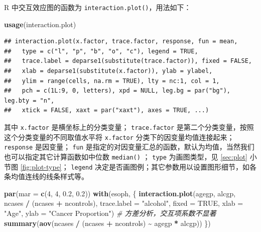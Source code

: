 \documentclass[
  b5paper,
  UTF8,twoside]{book}
\newenvironment{Shaded}{\begin{snugshade}}{\end{snugshade}}
\newcommand{\AttributeTok}[1]{\textcolor[rgb]{0.13,0.29,0.53}{#1}}
\newcommand{\CommentTok}[1]{\textcolor[rgb]{0.56,0.35,0.01}{\textit{#1}}}
\newcommand{\ConstantTok}[1]{\textcolor[rgb]{0.56,0.35,0.01}{#1}}
\newcommand{\DecValTok}[1]{\textcolor[rgb]{0.00,0.00,0.81}{#1}}
\newcommand{\FloatTok}[1]{\textcolor[rgb]{0.00,0.00,0.81}{#1}}
\newcommand{\FunctionTok}[1]{\textcolor[rgb]{0.13,0.29,0.53}{\textbf{#1}}}
\newcommand{\NormalTok}[1]{#1}
\newcommand{\SpecialCharTok}[1]{\textcolor[rgb]{0.81,0.36,0.00}{\textbf{#1}}}
\newcommand{\StringTok}[1]{\textcolor[rgb]{0.31,0.60,0.02}{#1}}
\begin{document}
R 中交互效应图的函数为 \texttt{interaction.plot()}，用法如下：

\begin{Shaded}
\begin{Highlighting}[]
\FunctionTok{usage}\NormalTok{(interaction.plot)}
\end{Highlighting}
\end{Shaded}

\begin{verbatim}
## interaction.plot(x.factor, trace.factor, response, fun = mean,
##   type = c("l", "p", "b", "o", "c"), legend = TRUE,
##   trace.label = deparse1(substitute(trace.factor)), fixed = FALSE,
##   xlab = deparse1(substitute(x.factor)), ylab = ylabel,
##   ylim = range(cells, na.rm = TRUE), lty = nc:1, col = 1,
##   pch = c(1L:9, 0, letters), xpd = NULL, leg.bg = par("bg"), leg.bty = "n",
##   xtick = FALSE, xaxt = par("xaxt"), axes = TRUE, ...)
\end{verbatim}

其中 \texttt{x.factor} 是横坐标上的分类变量； \texttt{trace.factor} 是第二个分类变量，按照这个分类变量的不同取值水平将 \texttt{x.factor} 分类下的因变量均值连接起来； \texttt{response} 是因变量； \texttt{fun} 是指定的对因变量汇总的函数，默认为均值，当然我们也可以指定其它计算函数如中位数 \texttt{median()} ； \texttt{type} 为画图类型，见 \ref{sec:plot} 小节图 \ref{fig:plot-type}； \texttt{legend} 决定是否画图例；其它参数用以设置图形细节，如各条均值连线的线条样式等。





\begin{Shaded}
\begin{Highlighting}[]
\FunctionTok{par}\NormalTok{(}\AttributeTok{mar =} \FunctionTok{c}\NormalTok{(}\DecValTok{4}\NormalTok{, }\DecValTok{4}\NormalTok{, }\FloatTok{0.2}\NormalTok{, }\FloatTok{0.2}\NormalTok{))}
\FunctionTok{with}\NormalTok{(esoph, \{}
  \FunctionTok{interaction.plot}\NormalTok{(agegp, alcgp, ncases }\SpecialCharTok{/}\NormalTok{ (ncases }\SpecialCharTok{+}\NormalTok{ ncontrols), }\AttributeTok{trace.label =} \StringTok{"alcohol"}\NormalTok{,}
                   \AttributeTok{fixed =} \ConstantTok{TRUE}\NormalTok{, }\AttributeTok{xlab =} \StringTok{"Age"}\NormalTok{, }\AttributeTok{ylab =} \StringTok{"Cancer Proportion"}\NormalTok{)}
  \CommentTok{\# 方差分析，交互项系数不显著}
  \FunctionTok{summary}\NormalTok{(}\FunctionTok{aov}\NormalTok{(ncases }\SpecialCharTok{/}\NormalTok{ (ncases }\SpecialCharTok{+}\NormalTok{ ncontrols) }\SpecialCharTok{\textasciitilde{}}\NormalTok{ agegp }\SpecialCharTok{*}\NormalTok{ alcgp))}
\NormalTok{\})}
\end{Highlighting}
\end{Shaded}
\end{document}
